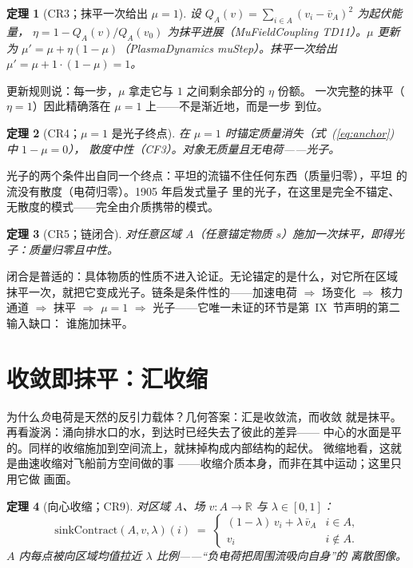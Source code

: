 \documentclass[aps,prd,preprint,superscriptaddress,amsmath,amssymb]{revtex4-2}
\newtheorem{theorem}{定理}[section]
\begin{document}
\begin{theorem}[CR3；抹平一次给出 $\mu=1$]
\label{thm:cr3}
设 $Q_A(v)=\sum_{i\in A}(v_i-\bar v_A)^2$ 为起伏能量，
$\eta=1-Q_A(v)/Q_A(v_0)$ 为抹平进展（MuFieldCoupling TD11）。$\mu$ 更新为
$\mu'=\mu+\eta(1-\mu)$（PlasmaDynamics muStep）。抹平一次给出
$\mu'=\mu+1\cdot(1-\mu)=1$。
\end{theorem}

更新规则说：每一步，$\mu$ 拿走它与 $1$ 之间剩余部分的 $\eta$ 份额。
一次完整的抹平（$\eta=1$）因此精确落在 $\mu=1$ 上——不是渐近地，而是一步
到位。

\begin{theorem}[CR4；$\mu=1$ 是光子终点]
\label{thm:cr4}
在 $\mu=1$ 时锚定质量消失（式~(\ref{eq:anchor}) 中 $1-\mu=0$），
散度中性（CF3）。对象无质量且无电荷——光子。
\end{theorem}

光子的两个条件出自同一个终点：平坦的流锚不住任何东西（质量归零），平坦
的流没有散度（电荷归零）。1905 年启发式量子 \cite{einstein1905erzeugung}
里的光子，在这里是完全不锚定、无散度的模式——完全由介质携带的模式。

\begin{theorem}[CR5；链闭合]
\label{thm:cr5}
对任意区域 $A$（任意锚定物质 $s$）施加一次抹平，即得光子：质量归零且中性。
\end{theorem}

闭合是普适的：具体物质的性质不进入论证。无论锚定的是什么，对它所在区域
抹平一次，就把它变成光子。链条是条件性的——加速电荷 $\Rightarrow$ 场变化
$\Rightarrow$ 核力通道 $\Rightarrow$ 抹平 $\Rightarrow$ $\mu=1$
$\Rightarrow$ 光子——它唯一未证的环节是第~IX~节声明的第二输入缺口：
谁施加抹平。

\section{收敛即抹平：汇收缩}
\label{sec:sink}

为什么\emph{负}电荷是天然的反引力载体？几何答案：汇是收敛流，而收敛
就是抹平。再看漩涡：涌向排水口的水，到达时已经失去了彼此的差异——
中心的水面是平的。同样的收缩施加到空间流上，就抹掉构成内部结构的起伏。
微缩地看，这就是曲速收缩对飞船前方空间做的事
\cite{alcubierre1994warp}——收缩介质本身，而非在其中运动；这里只用它做
画面。

\begin{theorem}[向心收缩；CR9]
\label{def:sinkcontract}
对区域 $A$、场 $v:A\to\mathbb R$ 与 $\lambda\in[0,1]$：
\[
\text{sinkContract}(A,v,\lambda)(i)
\;=\;\begin{cases}
(1-\lambda)\,v_i+\lambda\,\bar v_A & i\in A,\\
v_i & i\notin A .
\end{cases}
\]
$A$ 内每点被向区域均值拉近 $\lambda$ 比例——``负电荷把周围流吸向自身''的
离散图像。
\end{theorem}
\end{document}
